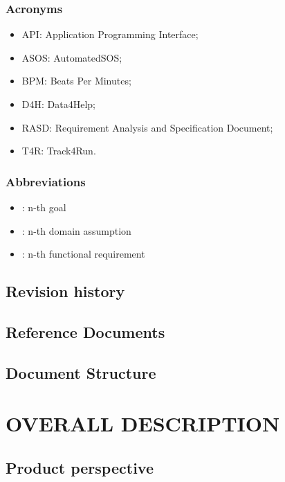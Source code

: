 \documentclass{article}
\begin{document}
\subsubsection{Acronyms}
\begin{itemize}
\item API: Application Programming Interface;
\item ASOS: AutomatedSOS;
\item BPM: Beats Per Minutes;
\item D4H: Data4Help;
\item RASD: Requirement Analysis and Specification Document;
\item T4R: Track4Run.
\end{itemize}

\subsubsection{Abbreviations}
\begin{itemize}
		\item \begin{math}[Gn]\end{math}: n-th goal
		\item \begin{math}[Dn]\end{math}: n-th domain assumption 
		\item \begin{math}[Rn]\end{math}: n-th functional requirement
\end{itemize}

\subsection{Revision history}
\subsection{Reference Documents}
\subsection{Document Structure}

\section{OVERALL DESCRIPTION}

\subsection{Product perspective}
\end{document}
